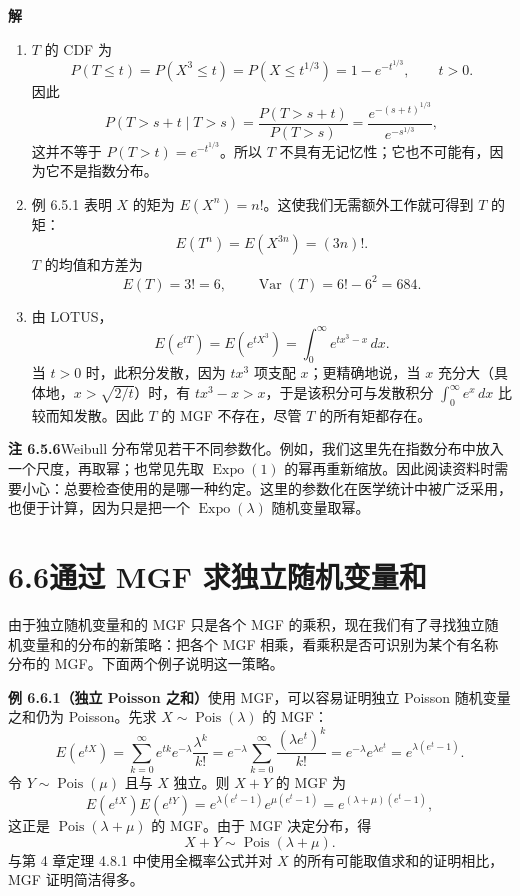\documentclass[UTF8,12pt,a4paper,fontset=fandol]{ctexart}
\begin{document}
\noindent\textbf{解}\quad
\begin{enumerate}
  \item $T$ 的 CDF 为
  \[
    P(T\le t)=P(X^3\le t)=P(X\le t^{1/3})=1-e^{-t^{1/3}},\qquad t>0.
  \]
  因此
  \[
    P(T>s+t\mid T>s)
    =
    \frac{P(T>s+t)}{P(T>s)}
    =
    \frac{e^{-(s+t)^{1/3}}}{e^{-s^{1/3}}},
  \]
  这并不等于 $P(T>t)=e^{-t^{1/3}}$。所以 $T$ 不具有无记忆性；它也不可能有，因为它不是指数分布。
  \item 例 6.5.1 表明 $X$ 的矩为 $E(X^n)=n!$。这使我们无需额外工作就可得到 $T$ 的矩：
  \[
    E(T^n)=E(X^{3n})=(3n)!.
  \]
  $T$ 的均值和方差为
  \[
    E(T)=3!=6,\qquad \operatorname{Var}(T)=6!-6^2=684.
  \]
  \item 由 LOTUS，
  \[
    E(e^{tT})=E(e^{tX^3})=\int_0^{\infty}e^{tx^3-x}\,dx.
  \]
  当 $t>0$ 时，此积分发散，因为 $tx^3$ 项支配 $x$；更精确地说，当 $x$ 充分大（具体地，$x>\sqrt{2/t}$）时，有 $tx^3-x>x$，于是该积分可与发散积分 $\int_0^{\infty}e^x\,dx$ 比较而知发散。因此 $T$ 的 MGF 不存在，尽管 $T$ 的所有矩都存在。
\end{enumerate}

\noindent\textbf{注 6.5.6}\quad Weibull 分布常见若干不同参数化。例如，我们这里先在指数分布中放入一个尺度，再取幂；也常见先取 $\operatorname{Expo}(1)$ 的幂再重新缩放。因此阅读资料时需要小心：总要检查使用的是哪一种约定。这里的参数化在医学统计中被广泛采用，也便于计算，因为只是把一个 $\operatorname{Expo}(\lambda)$ 随机变量取幂。

\section*{6.6\quad 通过 MGF 求独立随机变量和}

由于独立随机变量和的 MGF 只是各个 MGF 的乘积，现在我们有了寻找独立随机变量和的分布的新策略：把各个 MGF 相乘，看乘积是否可识别为某个有名称分布的 MGF。下面两个例子说明这一策略。

\noindent\textbf{例 6.6.1（独立 Poisson 之和）}\quad 使用 MGF，可以容易证明独立 Poisson 随机变量之和仍为 Poisson。先求 $X\sim\operatorname{Pois}(\lambda)$ 的 MGF：
\[
  E(e^{tX})
  =
  \sum_{k=0}^{\infty}e^{tk}e^{-\lambda}\frac{\lambda^k}{k!}
  =
  e^{-\lambda}\sum_{k=0}^{\infty}\frac{(\lambda e^t)^k}{k!}
  =
  e^{-\lambda}e^{\lambda e^t}
  =
  e^{\lambda(e^t-1)}.
\]
令 $Y\sim\operatorname{Pois}(\mu)$ 且与 $X$ 独立。则 $X+Y$ 的 MGF 为
\[
  E(e^{tX})E(e^{tY})
  =
  e^{\lambda(e^t-1)}e^{\mu(e^t-1)}
  =
  e^{(\lambda+\mu)(e^t-1)},
\]
这正是 $\operatorname{Pois}(\lambda+\mu)$ 的 MGF。由于 MGF 决定分布，得
\[
  X+Y\sim\operatorname{Pois}(\lambda+\mu).
\]
与第 4 章定理 4.8.1 中使用全概率公式并对 $X$ 的所有可能取值求和的证明相比，MGF 证明简洁得多。
\end{document}
